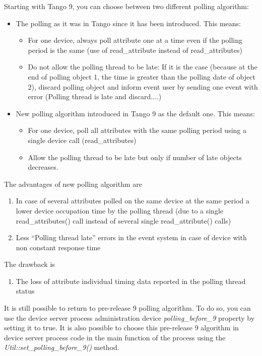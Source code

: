 Starting with Tango 9, you can choose between two different polling
algorithm:
\begin{itemize}
\item The polling as it was in Tango since it has been introduced. This
means:

\begin{itemize}
\item For one device, always poll attribute one at a time even if the polling
period is the same (use of read\_attribute instead of read\_attributes)
\item Do not allow the polling thread to be late: If it is the case (because
at the end of polling object 1, the time is greater than the polling
date of object 2), discard polling object and inform event user by
sending one event with error (Polling thread is late and discard....)
\end{itemize}
\item New polling algorithm introduced in Tango 9 as the default one. This
means:

\begin{itemize}
\item For one device, poll all attributes with the same polling period using
a single device call (read\_attributes)
\item Allow the polling thread to be late but only if number of late objects
decreases.
\end{itemize}
\end{itemize}
The advantages of new polling algorithm are 
\begin{enumerate}
\item In case of several attributes polled on the same device at the same
period a lower device occupation time by the polling thread (due to
a single read\_attributes() call instead of several single read\_attribute()
calls)
\item Less ``Polling thread late'' errors in the event system in case
of device with non constant response time
\end{enumerate}
The drawback is
\begin{enumerate}
\item The loss of attribute individual timing data reported in the polling
thread status
\end{enumerate}
It is still possible to return to pre-release 9 polling algorithm.
To do so, you can use the device server process administration device
\emph{polling\_before\_9}
property by setting it to true. It is also possible to choose this
pre-release 9 algorithm in device server process code in the main
function of the process using the \emph{Util::set\_polling\_before\_9()}
method.


